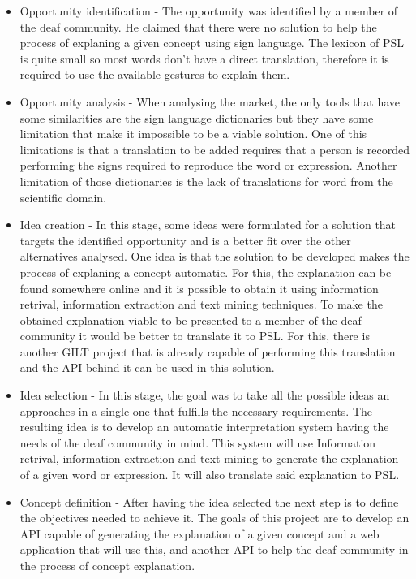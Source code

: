 \begin{itemize}
    \item Opportunity identification - The opportunity was identified by a member of the deaf community.
    He claimed that there were no solution to help the process of explaning a given concept using sign language.
    The lexicon of \gls{PSL} is quite small so most words don't have a direct translation, therefore it is required to use the available gestures to explain them.

    \item Opportunity analysis - When analysing the market, the only tools that have some similarities are the sign language dictionaries but they have some limitation that make it impossible to be a viable solution.
    One of this limitations is that a translation to be added requires that a person is recorded performing the signs required to reproduce the word or expression.
    Another limitation of those dictionaries is the lack of translations for word from the scientific domain.

    \item Idea creation - In this stage, some ideas were formulated for a solution that targets the identified opportunity and is a better fit over the other alternatives analysed.
    One idea is that the solution to be developed makes the process of explaning a concept automatic.
    For this, the explanation can be found somewhere online and it is possible to obtain it using information retrival, information extraction and text mining techniques.
    To make the obtained explanation viable to be presented to a member of the deaf community it would be better to translate it to \gls{PSL}.
    For this, there is another GILT project that is already capable of performing this translation and the \gls{API} behind it can be used in this solution.

    \item Idea selection - In this stage, the goal was to take all the possible ideas an approaches in a single one that fulfills the necessary requirements.
    The resulting idea is to develop an automatic interpretation system having the needs of the deaf community in mind.
    This system will use Information retrival, information extraction and text mining to generate the explanation of a given word or expression.
    It will also translate said explanation to \gls{PSL}.

    \item Concept definition - After having the idea selected the next step is to define the objectives needed to achieve it.
    The goals of this project are to develop an \gls{API} capable of generating the explanation of a given concept and a web application that will use this, and another \gls{API} to help the deaf community in the process of concept explanation. 

\end{itemize}

